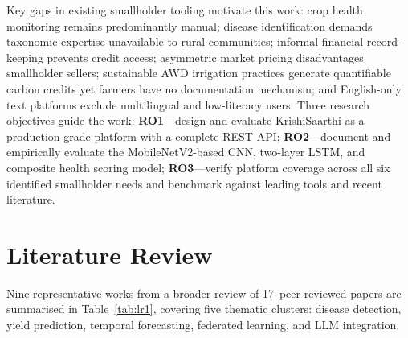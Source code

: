 \documentclass[conference]{IEEEtran}
\begin{document}
Key gaps in existing smallholder tooling motivate this work: crop health monitoring remains predominantly manual; disease identification demands taxonomic expertise unavailable to rural communities; informal financial record-keeping prevents credit access; asymmetric market pricing disadvantages smallholder sellers; sustainable AWD irrigation practices generate quantifiable carbon credits yet farmers have no documentation mechanism; and English-only text platforms exclude multilingual and low-literacy users. Three research objectives guide the work: \textbf{RO1}---design and evaluate KrishiSaarthi as a production-grade platform with a complete REST API; \textbf{RO2}---document and empirically evaluate the MobileNetV2-based CNN, two-layer LSTM, and composite health scoring model; \textbf{RO3}---verify platform coverage across all six identified smallholder needs and benchmark against leading tools and recent literature.

\section{Literature Review}
\label{sec:litreview}

Nine representative works from a broader review of 17~peer-reviewed papers are summarised in Table~\ref{tab:lr1}, covering five thematic clusters: disease detection, yield prediction, temporal forecasting, federated learning, and LLM integration.
\end{document}
